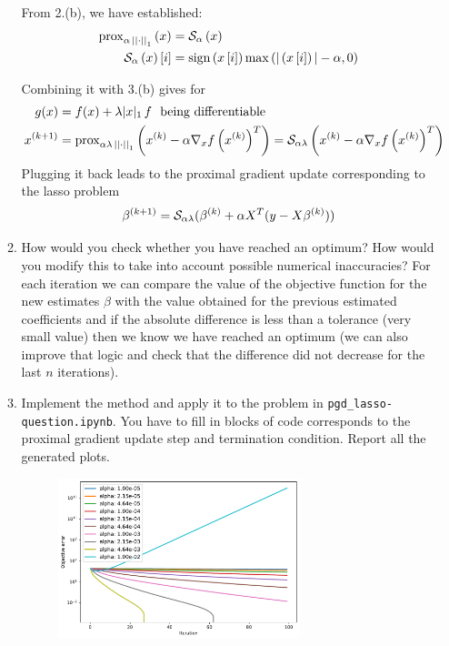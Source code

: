 \documentclass[12pt,twoside]{article}
\begin{document}
\begin{enumerate}
\begin{enumerate}
 From 2.(b), we have established:
 \begin{align*}
\operatorname{prox}_{\alpha \, \left|\left|  \cdot  \right|\right| _{1}}\left(  x  \right) & = \mathcal{ S }_{\alpha}\left( x \right) \\
\mathcal{ S }_{\alpha}\left( x \right)[i] &=  \operatorname{sign}{\left( x\,[i] \right)} \max{ (|\left( x\,[i] \right) | - \alpha , 0) } \\
\end{align*}


Combining it with 3.(b) gives for
 \begin{align*}
 	g(x) &= f(x) + \lambda |x|_1 \, f \text{~ being differentiable} \\
 x^{(k+1)} &= 	\operatorname{prox}_{\alpha \lambda \, \left|\left|  \cdot  \right|\right| _{1}}\left(  x^{(k)}  - \alpha \nabla_x f\left( x^{(k)} \right)^T  \right) = \mathcal{ S }_{\alpha \lambda}\left( x^{(k)}  - \alpha \nabla_x f\left( x^{(k)} \right)^T  \right)
\end{align*}
Plugging it back leads to the proximal gradient update corresponding to the lasso problem 
$$
	 \beta^{(k+1)} =  \mathcal{ S }_{\alpha \lambda} 	(\beta^{(k)} + \alpha X^T (y - X \beta^{(k)}))
$$

 \item How would you check whether you have reached an optimum? How would you modify this to take into account possible numerical inaccuracies?
 For each iteration we can compare the value of the objective function for the new estimates $\beta$ with the value obtained for the previous estimated coefficients and if the absolute difference is less
than a tolerance (very small  value) then we know we have  reached an optimum (we can also improve that logic and check that the difference did not decrease for the last $n$ iterations).
 
 \item Implement the method and apply it to the problem in \texttt{pgd\_lasso-question.ipynb}. You have to fill in blocks of code corresponds to the proximal gradient update step and termination condition. Report all the generated plots.\\
  
    	\begin{figure}[H]
		\centering
		\captionsetup{justification=centering}
		\includegraphics[width=200pt]{code/pgd/objective_error.pdf}
	\end{figure}


\end{enumerate}
\end{enumerate}
\end{document}
